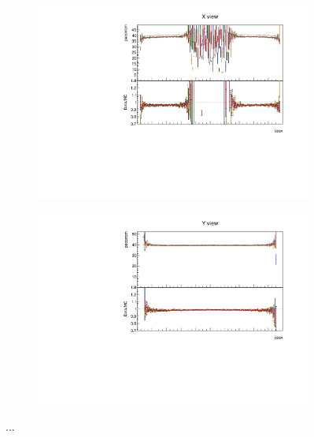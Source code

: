 \documentclass[12pt,a4paper]{article}
\begin{document}
\begin{figure}[!ht]
\begin{subfigure}{0.5\textwidth}
  \end{subfigure}
  \begin{subfigure}{0.5\textwidth}
    \includegraphics[width=\linewidth]{PlotsAngularDistribution/pecorrcm_cosx_x.pdf}
  \end{subfigure}
  \begin{subfigure}{0.5\textwidth}
    \includegraphics[width=\linewidth]{PlotsAngularDistribution/pecorrcm_cosx_y.pdf}
  \end{subfigure}
  \caption{...}
  \label{figAbsCalibCosX1}
\end{figure}
\end{document}
